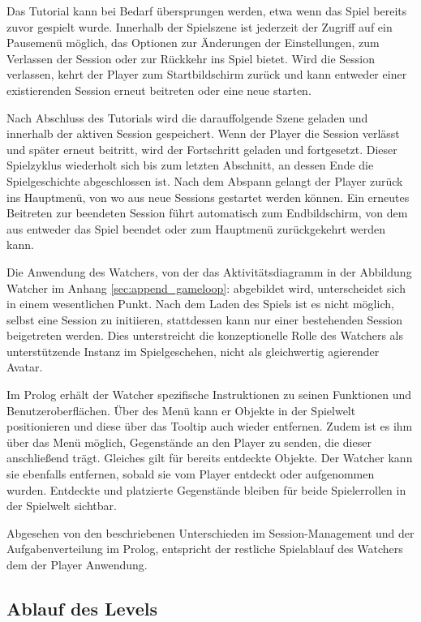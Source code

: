 Das Tutorial kann bei Bedarf übersprungen werden, etwa wenn das Spiel bereits zuvor gespielt wurde. Innerhalb der Spielszene ist jederzeit der Zugriff auf ein Pausemenü möglich, das Optionen zur Änderungen der Einstellungen, zum Verlassen der Session oder zur Rückkehr ins Spiel bietet. Wird die Session verlassen, kehrt der Player zum Startbildschirm zurück und kann entweder einer existierenden Session erneut beitreten oder eine neue starten.

Nach Abschluss des Tutorials wird die darauffolgende Szene geladen und innerhalb der aktiven Session gespeichert. Wenn der Player die Session verlässt und später erneut beitritt, wird der Fortschritt geladen und fortgesetzt. Dieser Spielzyklus wiederholt sich bis zum letzten Abschnitt, an dessen Ende die Spielgeschichte abgeschlossen ist. Nach dem Abspann gelangt der Player zurück ins Hauptmenü, von wo aus neue Sessions gestartet werden können. Ein erneutes Beitreten zur beendeten Session führt automatisch zum Endbildschirm, von dem aus entweder das Spiel beendet oder zum Hauptmenü zurückgekehrt werden kann.

Die Anwendung des Watchers, von der das Aktivitätsdiagramm in der Abbildung Watcher im Anhang \ref{sec:append_gameloop}:  abgebildet wird, unterscheidet sich in einem wesentlichen Punkt. Nach dem Laden des Spiels ist es nicht möglich, selbst eine Session zu initiieren, stattdessen kann nur einer bestehenden Session beigetreten werden. Dies unterstreicht die konzeptionelle Rolle des Watchers als unterstützende Instanz im Spielgeschehen, nicht als gleichwertig agierender Avatar.

Im Prolog erhält der Watcher spezifische Instruktionen zu seinen Funktionen und Benutzeroberflächen. Über des Menü  kann er Objekte in der Spielwelt positionieren und diese über das Tooltip auch wieder entfernen. Zudem ist es ihm über das Menü  möglich, Gegenstände an den Player zu senden, die dieser anschließend trägt. Gleiches gilt für bereits entdeckte Objekte. Der Watcher kann sie ebenfalls entfernen, sobald sie vom Player entdeckt oder aufgenommen wurden. Entdeckte und platzierte Gegenstände bleiben für beide Spielerrollen in der Spielwelt sichtbar.

Abgesehen von den beschriebenen Unterschieden im Session-Management und der Aufgabenverteilung im Prolog, entspricht der restliche Spielablauf des Watchers dem der Player Anwendung.

\subsection{Ablauf des Levels}


